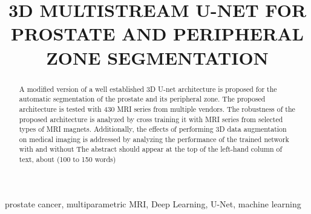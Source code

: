 \documentclass{article}
\title{3D MULTISTREAM U-NET FOR PROSTATE AND PERIPHERAL ZONE SEGMENTATION}
\begin{document}
\maketitle

\begin{abstract}
A modified version of a well established 3D U-net architecture is proposed
for the automatic segmentation of the prostate and its peripheral zone. The
proposed architecture is tested with 430 MRI series from multiple vendors. 
The robustness of the proposed architecture is analyzed by cross training
it with MRI series from selected types of MRI magnets. Additionally, the 
effects of performing 3D data augmentation on medical imaging is addressed
by analyzing the performance of the trained network with and without 
The abstract should appear at the top of the left-hand column of text, about
(100 to 150 words)
\end{abstract}

\begin{keywords}
prostate cancer, multiparametric MRI, Deep Learning, U-Net, machine learning
\end{keywords}








\end{document}
